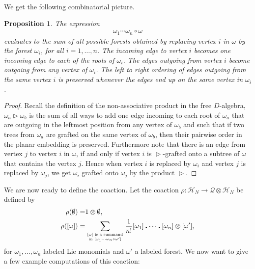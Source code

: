 \documentclass[10pt,a4paper]{article}
\newtheorem{proposition}[theorem]{Proposition}
\DeclareMathOperator{\graft}{\triangleright}
\begin{document}
We get the following combinatorial picture.

\begin{proposition}
The expression
\begin{align*}
\omega_1 \cdots \omega_n \circ \omega
\end{align*}
evaluates to the sum of all possible forests obtained by replacing vertex $i$ in $\omega$ by the forest $\omega_i$, for all $i=1,\dots,n$. The incoming edge to vertex $i$ becomes one incoming edge to each of the roots of $\omega_i$. The edges outgoing from vertex $i$ become outgoing from any vertex of $\omega_i$. The left to right ordering of edges outgoing from the same vertex $i$ is preserved whenever the edges end up on the same vertex in $\omega_i$.
\end{proposition}

\begin{proof}
Recall the definition of the non-associative product in the free $D$-algebra, $\omega_a \graft \omega_b$ is the sum of all ways to add one edge incoming to each root of $\omega_a$ that are outgoing in the leftmost position from any vertex of $\omega_b$ and such that if two trees from $\omega_a$ are grafted on the same vertex of $\omega_b$, then their pairwise order in the planar embedding is preserved. Furthermore note that there is an edge from vertex $j$ to vertex $i$ in $\omega$, if and only if vertex $i$ is $\graft$-grafted onto a subtree of $\omega$ that contains the vertex $j$. Hence when vertex $i$ is replaced by $\omega_i$ and vertex $j$ is replaced by $\omega_j$, we get $\omega_i$ grafted onto $\omega_j$ by the product $\graft$.
\end{proof}

We are now ready to define the coaction. Let the coaction $\rho: \mathcal{H}_N \to \mathcal{Q} \otimes \mathcal{H}_N$ be defined by
\begin{align*}
\rho(\emptyset)=&1 \otimes \emptyset, \\
\rho([\omega])=&\sum_{[\omega] \text{ is a summand} \atop \text{in } [\omega_1 \cdots \omega_n \circ \omega']}\frac{1}{n!} [\omega_1]\centerdot \cdots \centerdot[\omega_n] \otimes [\omega'],
\end{align*}
for $\omega_1,\dots,\omega_n$ labeled Lie monomials and $\omega'$ a labeled forest. We now want to give a few example computations of this coaction:
\end{document}
